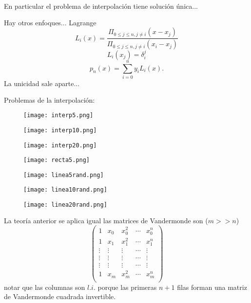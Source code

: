  En particular el problema de interpolación tiene solución única...

Hay otros enfoques... Lagrange
$$
L_i(x)=\frac{\Pi_{0\le j\le n, j\neq i}(x-x_j)}{\Pi_{0\le j\le n, j\neq i}(x_i-x_j)}
$$
 $$
 L_i(x_j)=\delta_i^j
 $$
 $$
 p_n(x)=\sum_{i=0}^ny_iL_i(x).
 $$
 La unicidad sale aparte...

 Problemas de la interpolación:

 \begin{figure}
\centering\texttt{[image: interp5.png]}
\end{figure}


\begin{figure}
\centering\texttt{[image: interp10.png]}
\end{figure}

\begin{figure}
\centering\texttt{[image: interp20.png]}
\end{figure}


 \begin{figure}
\centering\texttt{[image: recta5.png]}
\end{figure}


 \begin{figure}
\centering\texttt{[image: linea5rand.png]}
\end{figure}

\begin{figure}
\centering\texttt{[image: linea10rand.png]}
\end{figure}

\begin{figure}
\centering\texttt{[image: linea20rand.png]}
\end{figure}

La teoría anterior se aplica igual las matrices de Vandermonde son ($m>>n$)
 $$
 \begin{pmatrix}
 1&x_{0}&x_{0}^{2}&\cdots &x_{0}^{n}\\
 1&x_{1}&x_{1}^{2}&\cdots &x_{1}^{n}\\
 \vdots&\vdots&\vdots&\cdots&\vdots\\
 \vdots&\vdots&\vdots&\cdots&\vdots\\
  \vdots&\vdots&\vdots&\cdots&\vdots\\
 1&x_{m}&x_{m}^{2}&\cdots &x_{m}^{n}\\
 \end{pmatrix}
$$
notar que las columnas son $l.i.$ porque las primeras $n+1$ filas forman una matriz de Vandermonde
cuadrada invertible.

